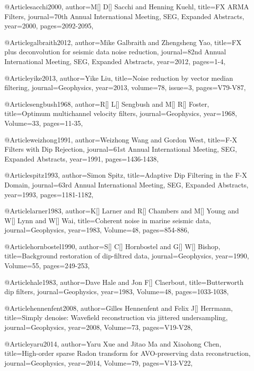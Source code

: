 @Article{sacchi2000,
  author={M[] D[] Sacchi and Henning Kuehl},
  title={FX ARMA Filters},
  journal={70th Annual International Meeting, SEG, Expanded Abstracts},
  year=2000,
  pages={2092-2095},
}

@Article{galbraith2012,
  author={Mike Galbraith and Zhengsheng Yao},
  title={FX plus deconvolution for seismic data noise reduction},
  journal={82nd Annual International Meeting, SEG, Expanded Abstracts},
  year=2012,
  pages={1-4},
}

@Article{yike2013,
  author={Yike Liu},
  title={Noise reduction by vector median filtering},
  journal={Geophysics},
  year=2013,
  volume=78,
  issue=3,
  pages={V79-V87},
}



@Article{sengbush1968,
  author={R[] L[] Sengbush and M[] R[] Foster},
  title={Optimum multichannel velocity filters},
  journal={Geophysics},
  year=1968,
  Volume=33,
  pages={11-35},
}

@Article{weizhong1991,
  author={Weizhong Wang and Gordon West},
  title={F-X Filters with Dip Rejection},
  journal={61st Annual International Meeting, SEG, Expanded Abstracts},
  year=1991,
  pages={1436-1438},
}

@Article{spitz1993,
  author={Simon Spitz},
  title={Adaptive Dip Filtering in the F-X Domain},
  journal={63rd Annual International Meeting, SEG, Expanded Abstracts},
  year=1993,
  pages={1181-1182},
}


@Article{larner1983,
  author={K[] Larner and R[] Chambers and M[] Young and W[] Lynn and W[] Wai},
  title={Coherent noise in marine seismic data},
  journal={Geophysics},
  year=1983,
  Volume=48,
  pages={854-886},
}

@Article{hornbostel1990,
  author={S[] C[] Hornbostel and G[] W[] Bishop},
  title={Background restoration of dip-filtred data},
  journal={Geophysics},
  year=1990,
  Volume=55,
  pages={249-253},
}

@Article{hale1983,
  author={Dave Hale and Jon F[] Claerbout},
  title={Butterworth dip filters},
  journal={Geophysics},
  year=1983,
  Volume=48,
  pages={1033-1038},
}

@Article{hennenfent2008,
  author={Gilles Hennenfent and Felix J[] Herrmann},
  title={Simply denoise: Wavefield reconstruction via jittered undersampling},
  journal={Geophysics},
  year=2008,
  Volume=73,
  pages={V19-V28},
}

@Article{yaru2014,
  author={Yaru Xue and Jitao Ma and Xiaohong Chen},
  title={High-order sparse Radon transform for AVO-preserving data reconstruction},
  journal={Geophysics},
  year=2014,
  Volume=79,
  pages={V13-V22},
}

